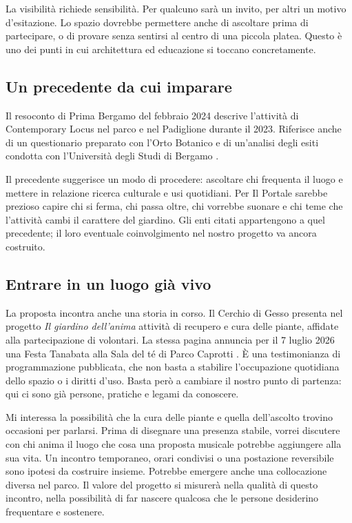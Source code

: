 La visibilità richiede sensibilità. Per qualcuno sarà un
invito, per altri un motivo d'esitazione. Lo spazio dovrebbe
permettere anche di ascoltare prima di partecipare, o di
provare senza sentirsi al centro di una piccola platea.
Questo è uno dei punti in cui architettura ed educazione
si toccano concretamente.

\subsection{Un precedente da cui imparare}
Il resoconto di Prima Bergamo del febbraio 2024 descrive
l'attività di Contemporary Locus nel parco e nel Padiglione
durante il 2023. Riferisce anche di un questionario preparato
con l'Orto Botanico e di un'analisi degli esiti condotta
con l'Università degli Studi di Bergamo
\cite{primabergamo2024}.

Il precedente suggerisce un modo di procedere: ascoltare
chi frequenta il luogo e mettere in relazione ricerca
culturale e usi quotidiani. Per Il Portale sarebbe prezioso
capire chi si ferma, chi passa oltre, chi vorrebbe suonare
e chi teme che l'attività cambi il carattere del giardino.
Gli enti citati appartengono a quel precedente; il loro
eventuale coinvolgimento nel nostro progetto va ancora costruito.

\subsection{Entrare in un luogo già vivo}
La proposta incontra anche una storia in corso. Il Cerchio di Gesso
presenta nel progetto \emph{Il giardino dell'anima} attività di
recupero e cura delle piante, affidate alla partecipazione di volontari.
La stessa pagina annuncia per il 7 luglio 2026 una Festa Tanabata
alla Sala del té di Parco Caprotti \cite{cerchio2026}.
È una testimonianza di programmazione pubblicata, che non basta
a stabilire l'occupazione quotidiana dello spazio o i diritti d'uso.
Basta però a cambiare il nostro punto di partenza: qui ci sono già
persone, pratiche e legami da conoscere.

Mi interessa la possibilità che la cura delle piante e quella
dell'ascolto trovino occasioni per parlarsi. Prima di disegnare una
presenza stabile, vorrei discutere con chi anima il luogo che cosa
una proposta musicale potrebbe aggiungere alla sua vita.
Un incontro temporaneo, orari condivisi o una postazione reversibile
sono ipotesi da costruire insieme. Potrebbe emergere anche una
collocazione diversa nel parco. Il valore del progetto si misurerà
nella qualità di questo incontro, nella possibilità di far nascere
qualcosa che le persone desiderino frequentare e sostenere.

